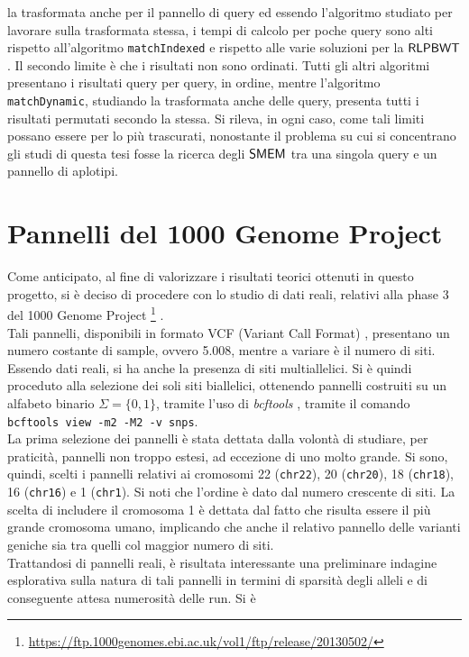 la trasformata anche per il pannello di query ed essendo l'algoritmo studiato
per lavorare sulla trasformata stessa, i tempi di calcolo per poche query sono
alti rispetto all'algoritmo \texttt{matchIndexed} e rispetto alle varie
soluzioni per la $\mbox{\rm {\sf RLPBWT}}$. Il secondo limite è che i risultati non sono
ordinati. Tutti gli altri algoritmi presentano i risultati query per query, in
ordine, mentre l'algoritmo \texttt{matchDynamic}, studiando la trasformata anche
delle query,
presenta tutti i risultati permutati secondo la stessa. Si rileva, in ogni caso,
come tali limiti possano essere per lo più trascurati, nonostante il problema su
cui si concentrano gli studi di questa tesi fosse la ricerca degli $\mbox{\rm {\sf SMEM}}$ tra
una 
singola query e un pannello di aplotipi.
\section{Pannelli del 1000 Genome Project}
Come anticipato, al fine di valorizzare i risultati teorici ottenuti in
questo progetto, si 
è deciso di procedere con lo studio di dati reali, relativi alla phase
  3 del 1000 Genome Project
\footnote{\url{https://ftp.1000genomes.ebi.ac.uk/vol1/ftp/release/20130502/}}
\cite{1kgp}.\\ 
Tali pannelli, disponibili in formato VCF (Variant Call Format) \cite{vcf},
presentano un numero 
costante di sample, ovvero 5.008, mentre a variare è il numero di siti. Essendo
dati reali, si ha anche la presenza di siti multiallelici. Si è quindi proceduto
alla selezione dei soli siti biallelici, ottenendo pannelli costruiti su
un alfabeto binario $\Sigma=\{0,1\}$, tramite l'uso di \textit{bcftools}
\cite{bcftools}, tramite il comando \texttt{bcftools view -m2 -M2
  -v snps}.\\
La prima selezione dei pannelli è stata dettata dalla volontà di studiare, per
praticità, pannelli non troppo estesi, ad eccezione di uno molto grande. Si
sono, 
quindi, scelti i pannelli relativi ai cromosomi 22 (\texttt{chr22}), 20
(\texttt{chr20}), 18 (\texttt{chr18}), 16 (\texttt{chr16}) e 1 (\texttt{chr1}).
Si noti che  
l'ordine è dato dal numero crescente di siti. La scelta di includere il
cromosoma 1 è dettata dal fatto che risulta essere il più grande cromosoma
umano, implicando che anche il relativo pannello delle varianti geniche
sia tra quelli col maggior numero di siti.\\
Trattandosi di pannelli reali, è risultata interessante una preliminare
indagine esplorativa sulla natura di tali pannelli in termini di
sparsità degli alleli e di conseguente attesa numerosità delle run. Si è
